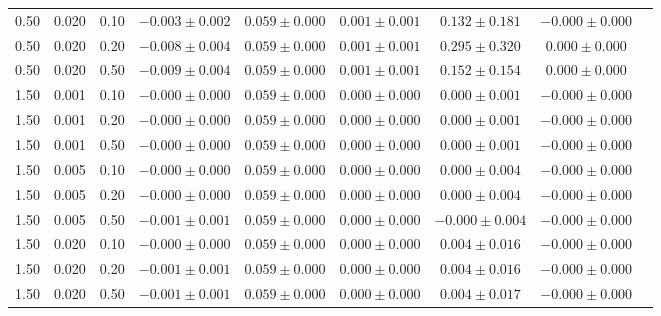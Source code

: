 \begin{tabular}{rrrcccccc}
0.50 & 0.020 & 0.10 & $-0.003\pm0.002$ & $0.059\pm0.000$ & $0.001\pm0.001$ & $0.132\pm0.181$ & $-0.000\pm0.000$ &  \\
0.50 & 0.020 & 0.20 & $-0.008\pm0.004$ & $0.059\pm0.000$ & $0.001\pm0.001$ & $0.295\pm0.320$ & $0.000\pm0.000$ &  \\
0.50 & 0.020 & 0.50 & $-0.009\pm0.004$ & $0.059\pm0.000$ & $0.001\pm0.001$ & $0.152\pm0.154$ & $0.000\pm0.000$ &  \\
1.50 & 0.001 & 0.10 & $-0.000\pm0.000$ & $0.059\pm0.000$ & $0.000\pm0.000$ & $0.000\pm0.001$ & $-0.000\pm0.000$ &  \\
1.50 & 0.001 & 0.20 & $-0.000\pm0.000$ & $0.059\pm0.000$ & $0.000\pm0.000$ & $0.000\pm0.001$ & $-0.000\pm0.000$ &  \\
1.50 & 0.001 & 0.50 & $-0.000\pm0.000$ & $0.059\pm0.000$ & $0.000\pm0.000$ & $0.000\pm0.001$ & $-0.000\pm0.000$ &  \\
1.50 & 0.005 & 0.10 & $-0.000\pm0.000$ & $0.059\pm0.000$ & $0.000\pm0.000$ & $0.000\pm0.004$ & $-0.000\pm0.000$ &  \\
1.50 & 0.005 & 0.20 & $-0.000\pm0.000$ & $0.059\pm0.000$ & $0.000\pm0.000$ & $0.000\pm0.004$ & $-0.000\pm0.000$ &  \\
1.50 & 0.005 & 0.50 & $-0.001\pm0.001$ & $0.059\pm0.000$ & $0.000\pm0.000$ & $-0.000\pm0.004$ & $-0.000\pm0.000$ &  \\
1.50 & 0.020 & 0.10 & $-0.000\pm0.000$ & $0.059\pm0.000$ & $0.000\pm0.000$ & $0.004\pm0.016$ & $-0.000\pm0.000$ &  \\
1.50 & 0.020 & 0.20 & $-0.001\pm0.001$ & $0.059\pm0.000$ & $0.000\pm0.000$ & $0.004\pm0.016$ & $-0.000\pm0.000$ &  \\
1.50 & 0.020 & 0.50 & $-0.001\pm0.001$ & $0.059\pm0.000$ & $0.000\pm0.000$ & $0.004\pm0.017$ & $-0.000\pm0.000$ &  \\
\hline
\end{tabular}
